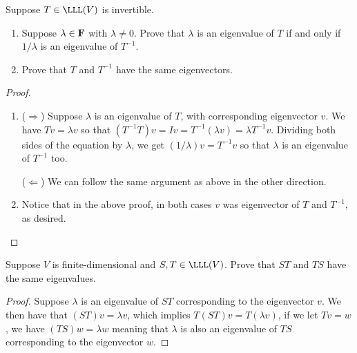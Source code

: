\begin{exercise}{21}
  Suppose $T\in\LLL(V)$ is invertible.
  \begin{enumerate}
      \item Suppose $\lambda\in\mathbf{F}$ with $\lambda\neq 0$. Prove that $\lambda$ is an eigenvalue of $T$ if and only if $1/\lambda$ is an eigenvalue of $T^{-1}$.
      \item Prove that $T$ and $T^{-1}$ have the same eigenvectors.
  \end{enumerate}
\end{exercise}
\begin{proof}
 \begin{enumerate}
     \item ($\Rightarrow$) Suppose $\lambda$ is an eigenvalue of $T$, with corresponding eigenvector $v$. We have $Tv=\lambda v$ so that $(T^{-1}T)v=Iv=T^{-1}(\lambda v)=\lambda T^{-1}v$. Dividing both sides of the equation by $\lambda$, we get $(1/\lambda)v=T^{-1}v$ so that $\lambda$ is an eigenvalue of $T^{-1}$ too.

     ($\Leftarrow$) We can follow the same argument as above in the other direction.
     \item Notice that in the above proof, in both cases $v$ was eigenvector of $T$ and $T^{-1}$, as desired.
 \end{enumerate}
\end{proof}

\begin{exercise}{23}
  Suppose $V$ is finite-dimensional and $S,T\in\LLL(V)$. Prove that $ST$ and $TS$ have the same eigenvalues.
\end{exercise}
\begin{proof}
 Suppose $\lambda$ is an eigenvalue of $ST$ corresponding to the eigenvector $v$. We then have that $(ST)v=\lambda v$, which implies $T(ST)v=T(\lambda v)$, if we let $Tv=w$, we have $(TS)w=\lambda w$ meaning that $\lambda$ is also an eigenvalue of $TS$ corresponding to the eigenvector $w$.
\end{proof}